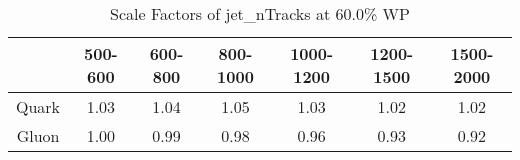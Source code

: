 \begin{table}
\centering
\caption{Scale Factors of jet_nTracks at 60.0\% WP}
\label{tab:jet_nTracks_0.6_Gluon}
\begin{tabular}{ccccccc}
\toprule
{} &  500-600 &  600-800 &  800-1000 &  1000-1200 &  1200-1500 &  1500-2000 \\
\midrule
Quark &     1.03 &     1.04 &      1.05 &       1.03 &       1.02 &       1.02 \\
Gluon &     1.00 &     0.99 &      0.98 &       0.96 &       0.93 &       0.92 \\
\bottomrule
\end{tabular}
\end{table}
